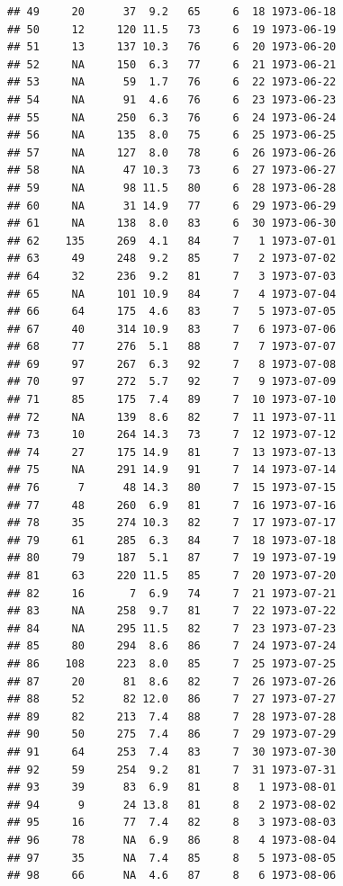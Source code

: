 \documentclass[11pt,]{book}
\begin{document}
\begin{verbatim}
## 49     20      37  9.2   65     6  18 1973-06-18
## 50     12     120 11.5   73     6  19 1973-06-19
## 51     13     137 10.3   76     6  20 1973-06-20
## 52     NA     150  6.3   77     6  21 1973-06-21
## 53     NA      59  1.7   76     6  22 1973-06-22
## 54     NA      91  4.6   76     6  23 1973-06-23
## 55     NA     250  6.3   76     6  24 1973-06-24
## 56     NA     135  8.0   75     6  25 1973-06-25
## 57     NA     127  8.0   78     6  26 1973-06-26
## 58     NA      47 10.3   73     6  27 1973-06-27
## 59     NA      98 11.5   80     6  28 1973-06-28
## 60     NA      31 14.9   77     6  29 1973-06-29
## 61     NA     138  8.0   83     6  30 1973-06-30
## 62    135     269  4.1   84     7   1 1973-07-01
## 63     49     248  9.2   85     7   2 1973-07-02
## 64     32     236  9.2   81     7   3 1973-07-03
## 65     NA     101 10.9   84     7   4 1973-07-04
## 66     64     175  4.6   83     7   5 1973-07-05
## 67     40     314 10.9   83     7   6 1973-07-06
## 68     77     276  5.1   88     7   7 1973-07-07
## 69     97     267  6.3   92     7   8 1973-07-08
## 70     97     272  5.7   92     7   9 1973-07-09
## 71     85     175  7.4   89     7  10 1973-07-10
## 72     NA     139  8.6   82     7  11 1973-07-11
## 73     10     264 14.3   73     7  12 1973-07-12
## 74     27     175 14.9   81     7  13 1973-07-13
## 75     NA     291 14.9   91     7  14 1973-07-14
## 76      7      48 14.3   80     7  15 1973-07-15
## 77     48     260  6.9   81     7  16 1973-07-16
## 78     35     274 10.3   82     7  17 1973-07-17
## 79     61     285  6.3   84     7  18 1973-07-18
## 80     79     187  5.1   87     7  19 1973-07-19
## 81     63     220 11.5   85     7  20 1973-07-20
## 82     16       7  6.9   74     7  21 1973-07-21
## 83     NA     258  9.7   81     7  22 1973-07-22
## 84     NA     295 11.5   82     7  23 1973-07-23
## 85     80     294  8.6   86     7  24 1973-07-24
## 86    108     223  8.0   85     7  25 1973-07-25
## 87     20      81  8.6   82     7  26 1973-07-26
## 88     52      82 12.0   86     7  27 1973-07-27
## 89     82     213  7.4   88     7  28 1973-07-28
## 90     50     275  7.4   86     7  29 1973-07-29
## 91     64     253  7.4   83     7  30 1973-07-30
## 92     59     254  9.2   81     7  31 1973-07-31
## 93     39      83  6.9   81     8   1 1973-08-01
## 94      9      24 13.8   81     8   2 1973-08-02
## 95     16      77  7.4   82     8   3 1973-08-03
## 96     78      NA  6.9   86     8   4 1973-08-04
## 97     35      NA  7.4   85     8   5 1973-08-05
## 98     66      NA  4.6   87     8   6 1973-08-06

\end{verbatim}
\end{document}
